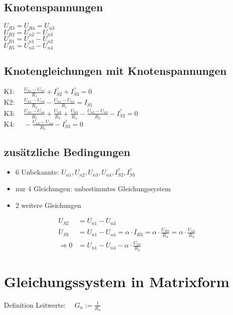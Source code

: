 \documentclass[11pt]{scrartcl}
\begin{document}
\subsection{Knotenspannungen}
\begin{doublespace}
\(\displaystyle U_{R3} = U_{R4} = U_{n3}\) \\
\(\displaystyle U_{R2} = U_{n2}- U_{n3}\) \\
\(\displaystyle U_{R1} = U_{n1}- U_{n2}\) \\
\(\displaystyle U_{R5} = U_{n3}- U_{n4}\)
\end{doublespace}

\subsection{Knotengleichungen mit Knotenspannungen}
\begin{spacing}{2.5}
  K1: \(\displaystyle \quad \frac{U_{n1} - U_{n2}}{R_1} + I_{S2}^? + I_{S3}^? = 0\) \\
  K2: \(\displaystyle \quad \frac{U_{n2} - U_{n3}}{R_2} - \frac{U_{n1} - U_{n2}}{R_1} = I_{S1}\) \\
  K3: \(\displaystyle \quad \frac{U_{n3} - U_{n4}}{R_5} + \frac{U_{n3}}{R_3} + \frac{U_{n3}}{R_4} - \frac{U_{n2} - U_{n3}}{R_2} - I_{S2}^?= 0\) \\
  K4: \(\displaystyle \quad - \frac{U_{n3} - U_{n4}}{R_5} - I_{S3}^? = 0\)
\end{spacing}

\subsection{zusätzliche Bedingungen}
\begin{itemize}
\item 6 Unbekannte: $U_{n1}, U_{n2}, U_{n3}, U_{n4}, I_{S2}^?, I_{S3}^?$
\item nur 4 Gleichungen: unbestimmtes Gleichungssystem
\item 2 weitere Gleichungen
\end{itemize}
\begin{align}
  U_{S2} &= U_{n1} - U_{n3} \\
  U_{S3} &= U_{n1} - U_{n4} = \alpha \cdot I_{R3} = \alpha \cdot \frac{U_{R3}}{R_3} = \alpha \cdot \frac{U_{n3}}{R_3} \nonumber \\
  \Longrightarrow 0 &= U_{n1} - U_{n4} - \alpha \cdot \frac{U_{n3}}{R_3}
\end{align}


\section{Gleichungssystem in Matrixform}
Definition Leitwerte: \(\displaystyle \quad G_n := \frac{1}{R_n}\)
\end{document}
